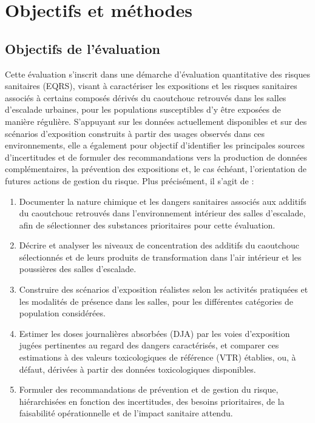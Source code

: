 \documentclass[pdflatex,sn-basic]{sn-jnl}%
\begin{document}

\section{Objectifs et méthodes}\label{sec2}

\subsection{Objectifs de l'évaluation}\label{subsec5}

Cette évaluation s'inscrit dans une démarche d'évaluation quantitative des risques sanitaires (EQRS), visant à caractériser les expositions et les risques sanitaires associés à certains composés dérivés du caoutchouc retrouvés dans les salles d'escalade urbaines, pour les
populations susceptibles d'y être exposées de manière régulière. S'appuyant sur les données actuellement disponibles et sur des scénarios d'exposition construits à partir des usages observés dans ces environnements, elle a également pour objectif d'identifier les principales sources d'incertitudes et de formuler des recommandations vers la production de données complémentaires, la prévention des expositions et, le cas échéant, l'orientation de futures actions de gestion du risque. Plus précisément, il s'agit de :

\begin{enumerate}
\item  Documenter la nature chimique et les dangers sanitaires associés aux additifs du caoutchouc retrouvés dans l'environnement intérieur des salles d'escalade, afin de sélectionner des substances prioritaires pour cette évaluation.
\item Décrire et analyser les niveaux de concentration des additifs du caoutchouc sélectionnés et de leurs produits de transformation dans l'air intérieur et les poussières des salles d'escalade.
\item Construire des scénarios d'exposition réalistes selon les activités pratiquées et les modalités de présence dans les salles, pour les différentes catégories de population considérées.
\item  Estimer les doses journalières absorbées (DJA) par les voies d'exposition jugées pertinentes au regard des dangers caractérisés, et comparer ces estimations à des valeurs toxicologiques de référence (VTR) établies, ou, à défaut, dérivées à partir des données toxicologiques disponibles.
\item  Formuler des recommandations de prévention et de gestion du risque, hiérarchisées en fonction des incertitudes, des besoins prioritaires, de la faisabilité opérationnelle et de l'impact sanitaire attendu.
\end{enumerate}
\end{document}
